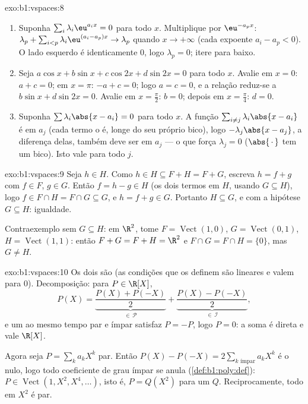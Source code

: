 \begin{solution}{exo:b1:vspaces:8}
\begin{enumerate}
  \item Suponha $\sum_{i} \lambda_i \eu^{a_i x} = 0$ para todo $x$.
        Multiplique por $\eu^{-a_p x}$: $\lambda_p + \sum_{i < p}
        \lambda_i \eu^{(a_i - a_p)x} \to \lambda_p$ quando $x \to
        +\infty$ (cada expoente
        $a_i - a_p < 0$). O lado esquerdo é identicamente $0$, logo $\lambda_p = 0$;
        itere para baixo.
  \item Seja $a\cos x + b \sin x + c \cos 2x + d\sin 2x = 0$ para todo $x$. Avalie em $x = 0$: $a + c = 0$; em
        $x = \pi$: $-a + c
        = 0$; logo $a = c = 0$, e a relação reduz-se a
        $b\sin
        x + d \sin 2x = 0$. Avalie em $x = \frac\pi2$: $b = 0$; depois em $x = \frac\pi4$: $d = 0$.
  \item Suponha $\sum \lambda_i \abs{x - a_i} = 0$ para todo $x$. A função $\sum_{i \neq j} \lambda_i\abs{x - a_i}$ é 
        em $a_j$ (cada termo o é, longe do seu próprio bico), logo
        $-\lambda_j \abs{x - a_j}$, a diferença delas, também deve ser  em
        $a_j$ --- o que força $\lambda_j = 0$ ($\abs{\,\cdot\,}$ tem um bico). Isto vale
        para todo $j$.
\end{enumerate}
\end{solution}

\begin{solution}{exo:b1:vspaces:9}
Seja $h \in H$. Como $h \in H \subseteq F + H = F + G$, escreva $h = f
+ g$ com $f \in F$, $g \in G$.
Então $f = h - g \in H$ (os dois termos em $H$, usando $G \subseteq H$), logo $f \in F \cap H = F \cap G
\subseteq G$, e
$h = f + g \in G$. Portanto $H \subseteq G$, e com a hipótese $G \subseteq H$: igualdade.

Contraexemplo sem $G \subseteq H$: em $\R^2$, tome $F =
\operatorname{Vect}(1,0)$, $G = \operatorname{Vect}(0,1)$, $H =
\operatorname{Vect}(1,1)$:
então $F + G = F + H = \R^2$ e $F \cap G
= F \cap H = \{0\}$, mas $G \neq H$.
\end{solution}

\begin{solution}{exo:b1:vspaces:10}
Os dois  são  (as condições que os definem são
lineares e valem para $0$). Decomposição: para $P \in \R[X]$,
\[
P(X) = \underbrace{\frac{P(X) + P(-X)}{2}}_{\in\,\mathcal P}
+ \underbrace{\frac{P(X) - P(-X)}{2}}_{\in\,\mathcal I},
\]
e um  ao mesmo tempo par e ímpar satisfaz $P = -P$, logo
$P = 0$: a soma é direta e vale $\R[X]$.

Agora seja $P = \sum_k a_k X^k$ par. Então $P(X) - P(-X) = 2
\sum_{k \text{ ímpar}} a_k X^k$ é o  nulo, logo todo
coeficiente de grau ímpar se anula (\cref{def:b1:poly:def}): $P \in
\operatorname{Vect}(1, X^2, X^4, \dots)$, isto é, $P = Q(X^2)$
para um  $Q$. Reciprocamente, todo  em $X^2$ é
par.
\end{solution}

